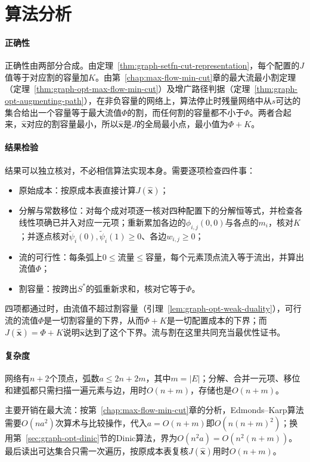 \section{算法分析}
\label{sec:graph-setfn-cut-analysis}

\paragraph{正确性}
正确性由两部分合成。由定理~\ref{thm:graph-setfn-cut-representation}，每个配置的$J$值等于对应割的容量加$K$。由第~\ref{chap:max-flow-min-cut}章的最大流最小割定理（定理~\ref{thm:graph-opt-max-flow-min-cut}）及增广路径判据（定理~\ref{thm:graph-opt-augmenting-path}），在非负容量的网络上，算法停止时残量网络中从$s$可达的集合给出一个容量等于最大流值$\Phi$的割，而任何割的容量都不小于$\Phi$。两者合起来，$\hat{\bm x}$对应的割容量最小，所以$\hat{\bm x}$是$J$的全局最小点，最小值为$\Phi+K$。

\paragraph{结果检验}
结果可以独立核对，不必相信算法实现本身。需要逐项检查四件事：
\begin{itemize}
  \item 原始成本：按原成本表直接计算$J(\hat{\bm x})$；
  \item 分解与常数移位：对每个成对项逐一核对四种配置下的分解恒等式，并检查各线性项确已并入对应一元项；重新累加各边的$\phi_{i,j}(0,0)$与各点的$m_i$，核对$K$；并逐点核对$\tilde\psi_i(0),\tilde\psi_i(1)\geq0$、各边$w_{i,j}\geq0$；
  \item 流的可行性：每条弧上$0\leq$流量$\leq$容量，每个元素顶点流入等于流出，并算出流值$\Phi$；
  \item 割容量：按跨出$S^\ast$的弧重新求和，核对它等于$\Phi$。
\end{itemize}
四项都通过时，由流值不超过割容量（引理~\ref{lem:graph-opt-weak-duality}），可行流的流值$\Phi$是一切割容量的下界，从而$\Phi+K$是一切配置成本的下界；而$J(\hat{\bm x})=\Phi+K$说明$\hat{\bm x}$达到了这个下界。流与割在这里共同充当最优性证书。

\paragraph{复杂度}
网络有$n+2$个顶点，弧数$a\leq2n+2m$，其中$m=|E|$；分解、合并一元项、移位和建弧都只需扫描一遍元素与边，用时$O(n+m)$，存储也是$O(n+m)$。

主要开销在最大流：按第~\ref{chap:max-flow-min-cut}章的分析，Edmonds--Karp算法需要$O(na^2)$次算术与比较操作，代入$a=O(n+m)$即$O(n(n+m)^2)$；换用第~\ref{sec:graph-opt-dinic}节的Dinic算法，界为$O(n^2a)=O(n^2(n+m))$。最后读出可达集合只需一次遍历，按原成本表复核$J(\hat{\bm x})$用时$O(n+m)$。

